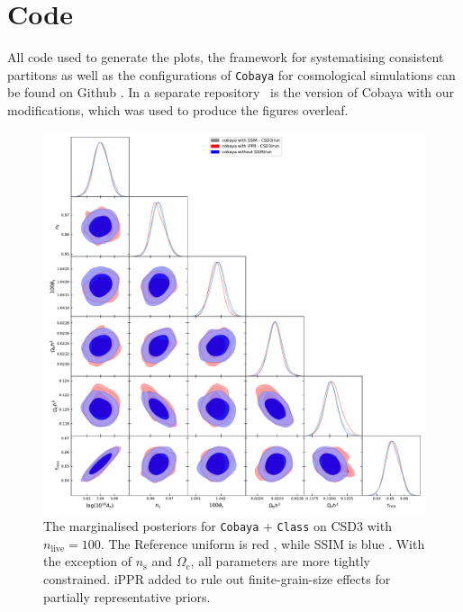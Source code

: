 \documentclass[usenatbib]{mnras}
\begin{document}
\appendix
\section{Code}
All code used to generate the plots, the framework for systematising
consistent partitons as well as the configurations of \texttt{Cobaya}
for cosmological simulations can be found on Github \citep{sspr}. In a
separate repository~\citep{code} is the version of Cobaya with our
modifications, which was used to produce the figures overleaf.




\begin{landscape}
\begin{figure}
  \centering %
  \includegraphics[height=0.95\textheight]{./illustrations/cosmology.pdf}
  \caption{The marginalised posteriors for \texttt{Cobaya} +
    \texttt{Class} on CSD3 with \(n_\text{live}=100\). The Reference
    uniform is \color{red} red \color{black}, while SSIM is
    \color{blue} blue \color{black}. With the exception of
    \(n_\mathrm{s}\) and \(\Omega_\mathrm{c}\), all parameters are
    more tightly constrained. iPPR added to rule out finite-grain-size
    effects for partially representative
    priors. } \label{fig:cosmology}
\end{figure}
\end{landscape}
\end{document}
